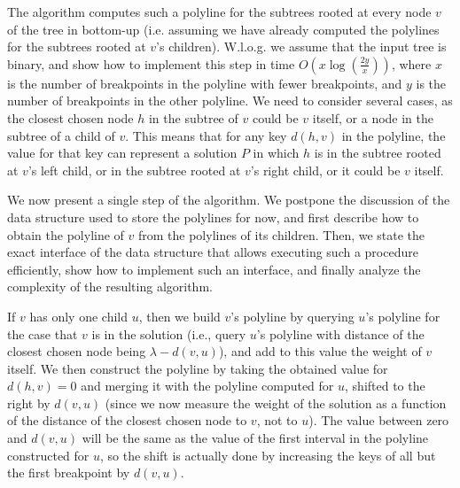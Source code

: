 \documentclass[a4paper,UKenglish]{lipics-v2016}
\theoremstyle{plain}
\begin{document}
The algorithm computes such a polyline for the subtrees rooted at every node $v$ of the tree in bottom-up (i.e. assuming we have already computed the polylines for the subtrees rooted at $v$'s children). W.l.o.g. we assume that the input tree is binary, and show how to
implement this step in time $O(x \log (\frac{2y}{x}))$, where $x$ is the number of breakpoints in the polyline with fewer breakpoints, and $y$ is the number of breakpoints in the other polyline.
We need to consider several cases, as the closest chosen node $h$ in the subtree of $v$ could be $v$ itself, or a node in the subtree of a child of $v$. This means that for any key $d(h,v)$ in the polyline, the value for that key can represent a solution $P$ in which $h$ is in the subtree rooted at $v$'s left child, or in the subtree rooted at $v$'s right child, or it could be $v$ itself.


\medskip {} We now present a single step of the algorithm. We postpone the discussion of the data structure used to store the polylines for now, and first describe how to obtain the polyline of $v$ from the polylines of its children. Then, we state the exact interface of the data structure that allows executing such a procedure efficiently, show how to implement such an interface, and finally analyze the complexity of the resulting algorithm.

If $v$ has only one child $u$, then we build $v$'s polyline by querying $u$'s polyline for the case that $v$ is in the solution (i.e., query $u$'s polyline with distance of the closest chosen node being $\lambda-d(v,u)$), and add to this value the weight of $v$ itself. We then construct the polyline by taking the obtained value for $d(h,v)=0$ and merging it with the polyline computed for $u$, shifted to the right by $d(v,u)$ (since we now measure the weight of the solution as a function of the distance of the closest chosen node to $v$, not to $u$). The value between zero and $d(v,u)$ will be the same as the value of the first interval in the polyline constructed for $u$, so the shift is actually done by increasing the keys of all but the first breakpoint by $d(v,u)$.
\end{document}
